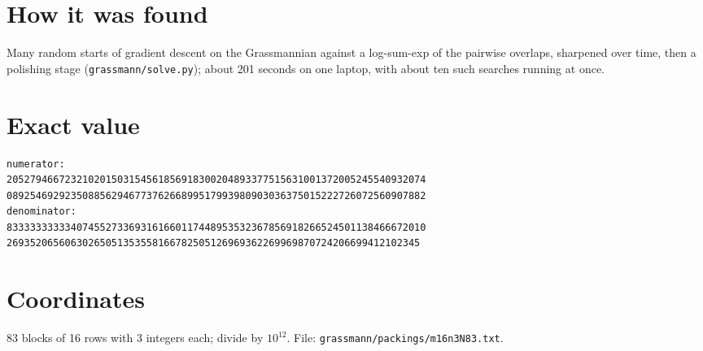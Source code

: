\documentclass[11pt,a4paper]{article}
\begin{document}
\section{How it was found}
Many random starts of gradient descent on the Grassmannian against a log-sum-exp of the pairwise overlaps, sharpened over time, then a polishing stage (\texttt{grassmann/solve.py}); about 201 seconds on one laptop, with about ten such searches running at once.


\appendix
\section{Exact value}
{\small
\begin{verbatim}
numerator:
205279466723210201503154561856918300204893377515631001372005245540932074
089254692923508856294677376266899517993980903036375015222726072560907882
denominator:
833333333334074552733693161660117448953532367856918266524501138466672010
26935206560630265051353558166782505126969362269969870724206699412102345
\end{verbatim}}

\section{Coordinates}
83 blocks of 16 rows with 3 integers each; divide by $10^{12}$. File: \texttt{grassmann/packings/m16n3N83.txt}.
{\tiny
\begin{multicols}{3}
\end{multicols}}
\end{document}
